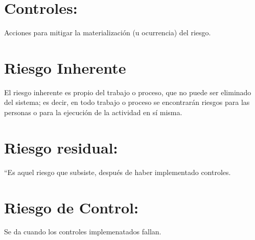 \documentclass[12pt]{book}
\begin{document}
\section{Controles:} Acciones para mitigar la materialización (u ocurrencia) del riesgo.

\section{Riesgo Inherente}El riesgo inherente es propio del trabajo o proceso, que no puede ser eliminado del sistema; es decir, en
todo trabajo o proceso se encontrarán riesgos para las personas o para la ejecución de la actividad en sí
misma.
\section{Riesgo residual:} “Es aquel riesgo que subsiste, después de haber implementado controles.
\section{Riesgo de Control:} Se da cuando los controles implemenatados fallan.
\end{document}
